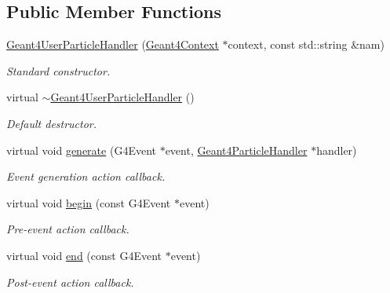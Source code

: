 \subsection*{Public Member Functions}
\begin{DoxyCompactItemize}
\item 
\hyperlink{class_d_d4hep_1_1_simulation_1_1_geant4_user_particle_handler_aed274ebbaf0e9c9a1b336298cdbab183}{Geant4UserParticleHandler} (\hyperlink{class_d_d4hep_1_1_simulation_1_1_geant4_context}{Geant4Context} $\ast$context, const std::string \&nam)
\begin{DoxyCompactList}\small\item\em Standard constructor. \item\end{DoxyCompactList}\item 
virtual \hyperlink{class_d_d4hep_1_1_simulation_1_1_geant4_user_particle_handler_a0e3bc88e6d3a625600006182d5cdd8c0}{$\sim$Geant4UserParticleHandler} ()
\begin{DoxyCompactList}\small\item\em Default destructor. \item\end{DoxyCompactList}\item 
virtual void \hyperlink{class_d_d4hep_1_1_simulation_1_1_geant4_user_particle_handler_abd7d1f82639f33dd16563c4beb936c9e}{generate} (G4Event $\ast$event, \hyperlink{class_d_d4hep_1_1_simulation_1_1_geant4_particle_handler}{Geant4ParticleHandler} $\ast$handler)
\begin{DoxyCompactList}\small\item\em Event generation action callback. \item\end{DoxyCompactList}\item 
virtual void \hyperlink{class_d_d4hep_1_1_simulation_1_1_geant4_user_particle_handler_ad63271464e7ae89e8e7ec0149bc92b93}{begin} (const G4Event $\ast$event)
\begin{DoxyCompactList}\small\item\em Pre-\/event action callback. \item\end{DoxyCompactList}\item 
virtual void \hyperlink{class_d_d4hep_1_1_simulation_1_1_geant4_user_particle_handler_a44c00d22c0fba91cf4a32db049728805}{end} (const G4Event $\ast$event)
\begin{DoxyCompactList}\small\item\em Post-\/event action callback. \item\end{DoxyCompactList}\item 

\end{DoxyCompactItemize}
